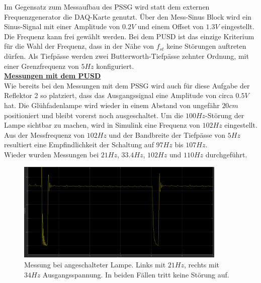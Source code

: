 \documentclass[a4paper,12pt]{article}
\begin{document}
	\noindent
	Im Gegensatz zum Messaufbau des PSSG wird statt dem externen Frequenzgenerator die DAQ-Karte genutzt.\newline
	Über den Mess-Sinus Block wird ein Sinus-Signal mit einer Amplitude von $0.2V$ und einem Offset von $1.3V$ eingestellt.\newline
	Die Frequenz kann frei gewählt werden. Bei dem PUSD ist das einzige Kriterium für die Wahl der Frequenz, dass in der Nähe von $f_{st}$ keine Störungen auftreten dürfen.\newline
	Als Tiefpässe werden zwei Butterworth-Tiefpässe zehnter Ordnung, mit einer Grenzfrequenz von $5Hz$ konfiguriert.\\ \newline
	\underline{\textbf{Messungen mit dem PUSD}} \\ \newline
	\noindent
	Wie bereits bei den Messungen mit dem PSSG wird auch für diese Aufgabe der Reflektor 2 so platziert, dass das Ausgangssignal eine Amplitude von circa $0.5V$ hat.\newline
	Die Glühfadenlampe wird wieder in einem Abstand von ungefähr $20cm$ positioniert und bleibt vorerst noch ausgeschaltet.\newline
	Um die $100Hz$-Störung der Lampe sichtbar zu machen, wird in Simulink eine Frequenz von $102Hz$ eingestellt.\newline
	Aus der Messfrequenz von $102Hz$ und der Bandbreite der Tiefpässe von $5Hz$ resultiert eine Empfindlichkeit der Schaltung auf $97Hz$ bis $107Hz$.\\ \newline
	Wieder wurden Messungen bei $21Hz$, $33.4Hz$, $102Hz$ und $110Hz$ durchgeführt.\newline
	\begin{figure}[H]
		\centering
		\includegraphics[width=10cm]{assets/pusd_21Hz_34_Hz}
		\caption{Messung bei angeschalteter Lampe. Links mit $21Hz$, rechts mit $34Hz$ Ausgangsspannung. In beiden Fällen tritt keine Störung auf.}
	\end{figure}
\end{document}
